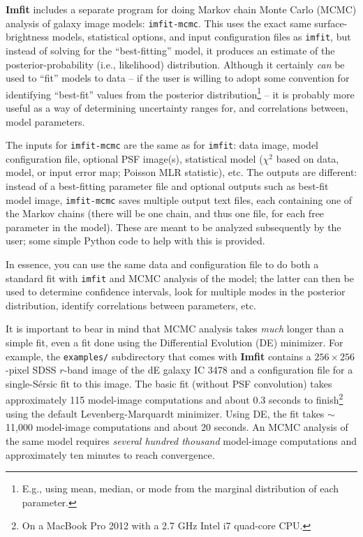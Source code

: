 \documentclass[10pt,a4paper,article]{memoir}
\newcommand{\Imfit}{\textbf{Imfit}}
\newcommand{\imfitprog}{\texttt{imfit}}
\newcommand{\imfitmcmc}{\texttt{imfit-mcmc}}
\newcommand{\chisquare}{\ensuremath{\chi^{2}}}
\begin{document}
\Imfit{} includes a separate program for doing Markov
chain Monte Carlo (MCMC) analysis of galaxy image models: \imfitmcmc.
This uses the exact same surface-brightness models, statistical options,
and input configuration files as \imfitprog, but instead of solving for
the ``best-fitting'' model, it produces an estimate of the
posterior-probability (i.e., likelihood) distribution. Although it
certainly \textit{can} be used to ``fit'' models to data -- if the user
is willing to adopt some convention for identifying ``best-fit'' values
from the posterior distribution\footnote{E.g., using mean, median, or
mode from the marginal distribution of each parameter.} -- it is
probably more useful as a way of determining uncertainty ranges for, and
correlations between, model parameters.

The inputs for \imfitmcmc{} are the same as for \imfitprog: data image,
model configuration file, optional PSF image(s), statistical model
(\chisquare{} based on data, model, or input error map; Poisson MLR
statistic), etc. The outputs are different: instead of a best-fitting
parameter file and optional outputs such as best-fit model image,
\imfitmcmc{} saves multiple output text files, each containing one of
the Markov chains (there will be one chain, and thus one file, for each
free parameter in the model). These are meant to be analyzed
subsequently by the user; some simple Python code to help with this is
provided.

In essence, you can use the same data and configuration file to do both a
standard fit with \imfitprog{} and MCMC analysis of the model; the
latter can then be used to determine confidence intervals, look for
multiple modes in the posterior distribution, identify correlations
between parameters, etc.

It is important to bear in mind that MCMC analysis takes \textit{much}
longer than a simple fit, even a fit done using the Differential
Evolution (DE) minimizer. For example, the \texttt{examples/}
subdirectory that comes with \Imfit{} contains a $256 \times 256$-pixel
SDSS $r$-band image of the dE galaxy IC 3478 and a configuration file for a
single-S{\'e}rsic fit to this image. The basic fit (without PSF
convolution) takes approximately 115 model-image computations and about
0.3 seconds to finish\footnote{On a MacBook Pro 2012 with a 2.7 GHz
Intel i7 quad-core CPU.} using the default Levenberg-Marquardt
minimizer. Using DE, the fit takes $\sim$11,000 model-image computations
and about 20 seconds. An MCMC analysis of the same model requires
\textit{several hundred thousand} model-image computations and
approximately ten minutes to reach convergence.
\end{document}
